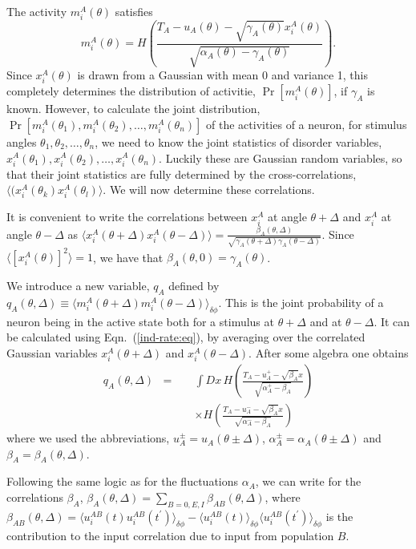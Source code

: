 The activity $m_i^A(\theta)$ satisfies
\begin{equation}
m_i^A(\theta)=H\left(\frac{T_A-u_A(\theta)-\sqrt{\gamma_A(\theta)}
x_i^A(\theta)}{\sqrt{\alpha_A(\theta)-\gamma_A(\theta)}}\right).
\label{ind-rate:eq}
\end{equation}
Since $x_i^A(\theta)$ is drawn from a Gaussian with mean 0 and variance 1,
this completely determines the distribution of activitie, $\Pr[m_i^A(\theta)]$, 
 if $\gamma_A$ is known. However, to calculate the joint distribution,
$\Pr[m_i^A(\theta_1),m_i^A(\theta_2),\ldots,m_i^A(\theta_n)]$ of the activities
of a neuron, for stimulus angles $\theta_1,\theta_2,\ldots,\theta_n$, we 
need to know the joint statistics of disorder variables, $x_i^A(\theta_1),
x_i^A(\theta_2),\ldots,x_i^A(\theta_n)$\@. Luckily these are Gaussian random
variables, so that their joint statistics are fully determined by the 
cross-correlations, $\langle(x_i^A(\theta_k)x_i^A(\theta_l)\rangle$\@.
We will now determine these correlations.

It is convenient to write the correlations between $x_i^A$ at angle 
$\theta+\Delta$ and $x_i^A$ at angle $\theta-\Delta$ as
$\langle x_i^A(\theta+\Delta)x_i^A(\theta-\Delta)\rangle=
\frac{\beta_A(\theta,\Delta)}
{\sqrt{\gamma_A(\theta+\Delta)\gamma_A(\theta-\Delta)}}$\@. Since
$\langle [x_i^A(\theta)]^2\rangle=1$, we have that 
$\beta_A(\theta,0)=\gamma_A(\theta)$\@.

We introduce a new variable, $q_A$ defined by $q_A(\theta,\Delta)\equiv
\langle m_i^A(\theta+\Delta)m_i^A(\theta-\Delta)\rangle_{\delta\phi}$\@.
This is the joint probability of a neuron being in the active state both
for a stimulus at $\theta+\Delta$ and at $\theta-\Delta$.
It can be calculated using Eqn.~(\ref{ind-rate:eq}), by averaging over 
the correlated Gaussian variables $x_i^A(\theta+\Delta)$ and 
$x_i^A(\theta-\Delta)$\@. After some algebra one obtains
\begin{eqnarray}
q_{A}(\theta,\Delta) & = &
\int\!Dx\, H\left(\frac{T_A-u_A^+-\sqrt{\beta_A}x}
{\sqrt{\alpha_A^+-\beta_A}}\right) \nonumber \\
&\qquad& \times H\left(\frac{T_A-u_A^--\sqrt{\beta_A}x}
{\sqrt{\alpha_A^--\beta_A}}\right)
\label{qA:eq}
\end{eqnarray}
where we used the abbreviations, $u_A^\pm=u_{A}(\theta\pm\Delta)$,
$\alpha_A^\pm=\alpha_{A}(\theta\pm\Delta)$ and
$\beta_A=\beta_{A}(\theta,\Delta)$\@.

Following the same logic as for the fluctuations $\alpha_A$, we can write for
the correlations $\beta_{A}$, $\beta_{A}(\theta,\Delta)=
\sum_{B=0,E,I}\beta_{AB}(\theta,\Delta)$, where 
$\beta_{AB}(\theta,\Delta)=
\langle u_i^{AB}(t)u_i^{AB}(t^\prime)\rangle_{\delta\phi}-
\langle u_i^{AB}(t)\rangle_{\delta\phi}
\langle u_i^{AB}(t^\prime)\rangle_{\delta\phi}$ is the 
contribution to the input correlation due to input from population $B$\@.

